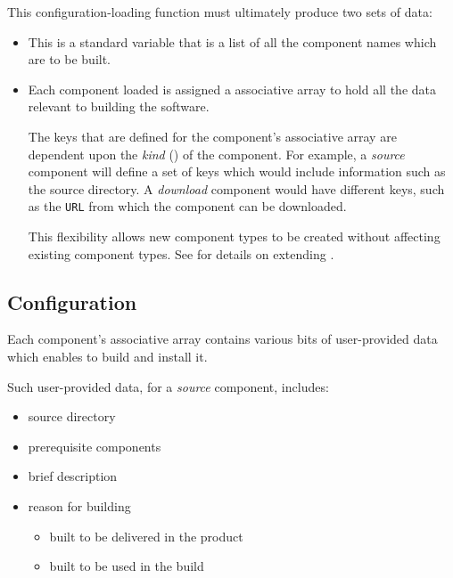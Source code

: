 This configuration-loading function must ultimately produce two sets
of data:

\begin{itemize}
\item \lmsbwcomponents

  This is a standard \gnumake variable that is a list of all the
  component names which are to be built.

\item {}

  Each component loaded is assigned a \gmsl{} associative
  array to hold all the data relevant to building the software.

  The keys that are defined for the component's associative array are
  dependent upon the \emph{kind} () of the
  component.  For example, a \emph{source} component will define a set
  of keys which would include information such as the source
  directory.  A \emph{download} component would have different keys,
  such as the \texttt{URL} from which the component can be downloaded.

  This flexibility allows new component types to be created without
  affecting existing component types.  See  for
  details on extending \lmsbw.
\end{itemize}


\subsection{ Configuration}

Each component's associative array contains various bits of
user-provided data which enables \lmsbw to build and install it.

Such user-provided data, for a \emph{source} component, includes:

\begin{itemize}
\item source directory
\item prerequisite components
\item brief description
\item reason for building
  \begin{itemize}
  \item built to be delivered in the product
  \item built to be used in the build
  \end{itemize}
\end{itemize}

